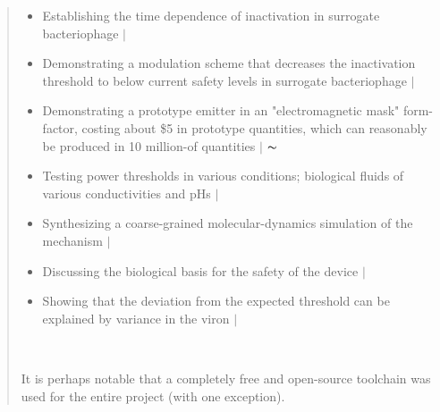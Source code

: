 \documentclass[paper.tex]{subfiles}
\begin{document}
\begin{quotation}
\begin{itemize}
  \item Establishing the time dependence of inactivation in surrogate bacteriophage $\vert$ \cmark
  \item Demonstrating a modulation scheme that decreases the inactivation threshold to below current safety levels in surrogate bacteriophage $\vert$ \cmark
  \item Demonstrating a prototype emitter in an "electromagnetic mask" form-factor, costing about \$5 in prototype quantities, which can reasonably be produced in 10 million-of quantities $\vert$ $\thicksim$
  \item Testing power thresholds in various conditions; biological fluids of various conductivities and pHs $\vert$ \xmark
  \item Synthesizing a coarse-grained molecular-dynamics simulation of the mechanism $\vert$ \xmark
  \item Discussing the biological basis for the safety of the device $\vert$ \cmark
  \item Showing that the deviation from the expected threshold can be explained by variance in the viron $\vert$ \cmark
  
\end{itemize}\


\tableofcontents


It is perhaps notable that a completely free and open-source toolchain was used for the entire project (with one exception).

\end{quotation}
\end{document}
